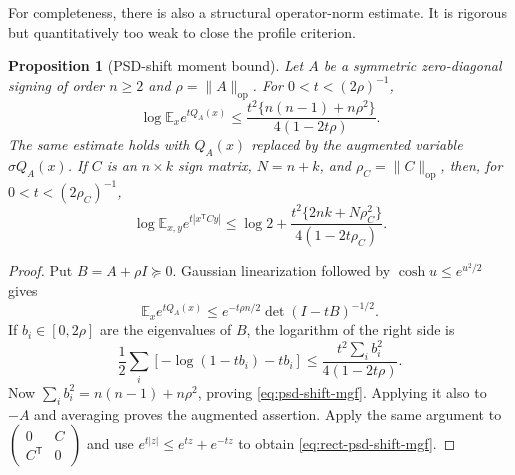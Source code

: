 \documentclass[11pt]{article}
\newtheorem{proposition}[theorem]{Proposition}
\newcommand{\E}{\mathbb E}
\begin{document}
For completeness, there is also a structural operator-norm estimate.  It is
rigorous but quantitatively too weak to close the profile criterion.

\begin{proposition}[PSD-shift moment bound]
\label{prop:psd-shift-mgf}
Let $A$ be a symmetric zero-diagonal signing of order $n\ge2$ and
$\rho=\|A\|_{\mathrm{op}}$.  For $0<t<(2\rho)^{-1}$,
\begin{equation}
 \log\E_xe^{tQ_A(x)}
 \le
 \frac{t^2\{n(n-1)+n\rho^2\}}{4(1-2t\rho)}.
 \label{eq:psd-shift-mgf}
\end{equation}
The same estimate holds with $Q_A(x)$ replaced by the augmented variable
$\sigma Q_A(x)$.
If $C$ is an $n\times k$ sign matrix, $N=n+k$, and
$\rho_C=\|C\|_{\mathrm{op}}$, then, for
$0<t<(2\rho_C)^{-1}$,
\begin{equation}
 \log\E_{x,y}e^{t|x^{\mathsf T}Cy|}
 \le\log2+
 \frac{t^2\{2nk+N\rho_C^2\}}{4(1-2t\rho_C)}.
 \label{eq:rect-psd-shift-mgf}
\end{equation}
\end{proposition}

\begin{proof}
Put $B=A+\rho I\succeq0$.  Gaussian linearization followed by
$\cosh u\le e^{u^2/2}$ gives
\[
 \E_xe^{tQ_A(x)}
 \le e^{-t\rho n/2}\det(I-tB)^{-1/2}.
\]
If $b_i\in[0,2\rho]$ are the eigenvalues of $B$, the logarithm of the right
side is
\[
 \frac12\sum_i[-\log(1-tb_i)-tb_i]
 \le\frac{t^2\sum_i b_i^2}{4(1-2t\rho)}.
\]
Now $\sum_i b_i^2=n(n-1)+n\rho^2$, proving
\eqref{eq:psd-shift-mgf}.  Applying it also to $-A$ and averaging proves the
augmented assertion.  Apply the same argument to
$\left(\begin{smallmatrix}0&C\\C^{\mathsf T}&0\end{smallmatrix}\right)$
and use $e^{t|z|}\le e^{tz}+e^{-tz}$ to obtain
\eqref{eq:rect-psd-shift-mgf}.
\end{proof}
\end{document}
